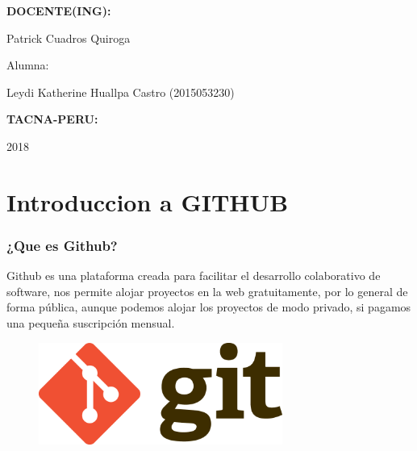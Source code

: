\documentclass[12pt,letterpaper]{article}
\begin{document}
\begin{titlepage}
\begin{center}
\vspace*{0.3in}
\begin{Large}
\textbf{DOCENTE(ING):} \\
\end{Large}

\vspace*{0.1in}
\begin{large}
 Patrick Cuadros Quiroga\\
\end{large}

\vspace*{0.2in}
\vspace*{0.1in}
\begin{large}
Alumna: \\
\begin{flushleft}
Leydi Katherine Huallpa Castro	           \hfill	(2015053230) \\
\end{flushleft}
\end{large}

\vspace*{0.3in}
\begin{Large}
\textbf{TACNA-PERU:} \\
\end{Large}

\vspace*{0.1in}
\begin{large}
2018\\
\end{large}

\end{center}

\end{titlepage}


\part{Introduccion a GITHUB}

\section{¿Que es Github?}
Github es una plataforma creada para facilitar el desarrollo colaborativo de software, nos permite alojar proyectos en la web gratuitamente, por lo general de forma pública, aunque podemos alojar los proyectos de modo privado, si pagamos una pequeña suscripción mensual.

\vspace*{-0.025in}
\begin{figure}[htb]
\begin{center}
\includegraphics[width=8cm]{./Imagenes/Git}
\end{center}
\end{figure}
\end{document}
